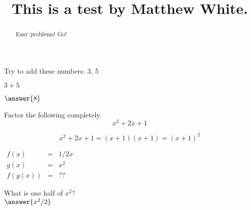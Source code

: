 \documentclass{ximera}
\title{This is a test by Matthew White.}
\begin{document}
	\begin{abstract}
		Easy problems! Go!
	\end{abstract}
	\maketitle
	
	
\begin{question}
	Try to add these numbers: 3, 5\\
	\begin{hint}
		$3 + 5$
		\end{hint}
	$\answer{8}$
\end{question}

	
  \begin{question}
  		Factor the following completely.\\
  		$$ x^2 + 2x + 1 $$ 
  		\begin{hint}
  			$$ x^2 + 2x + 1 = (x + 1)(x + 1) = (x + 1)^2 $$
  		\end{hint}
  		\begin{prompt}
  			\begin{multipleChoice}
  			\end{multipleChoice}
  		\end{prompt}
  \end{question}

	\begin{question}
		\begin{hint}
			$\begin{array}{rcl}f(x) & = & 1/2 x\\
			g(x) & = & x^2\\
			f(g(x)) & = & ??
			\end{array}$
			\end{hint}
		What is one half of $x^2$?\\
		$	\answer{x^2/2}$
	\end{question}

	
\end{document}
